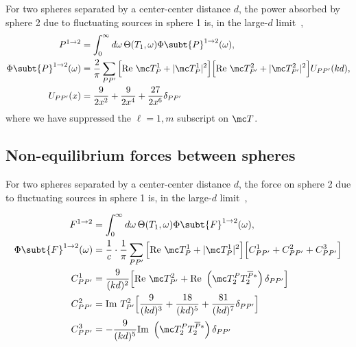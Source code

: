 \documentclass[letterpaper]{article}
\begin{document}
For two spheres separated by a center-center distance
$d$, the power absorbed by sphere 2 due to fluctuating
sources in sphere 1 is, in the large-$d$ limit~\cite{Kruger2012},
\begin{align*}
 P^{1\to 2} 
&= 
 \int_0^\infty d\omega \, \Theta(T_1,\omega) \Phi\subt{P}^{1\to 2}(\omega),
\\
 \Phi\subt{P}^{1\to 2}(\omega) 
&= 
 \frac{2}{\pi}\sum_{P P^\prime}
 \Big[ \text{Re }\mc T^1_{P} + |\mc T^1_{P}|^2\Big]
 \Big[ \text{Re }\mc T^2_{P^\prime} + |\mc T^2_{P^\prime}|^2\Big]
 U_{PP^\prime}(kd),
\\
 U_{PP^\prime}(x)
 &=\frac{9}{2x^2} + \frac{9}{2x^4} + \frac{27}{2x^6}\delta_{PP^\prime}
\end{align*}
where we have suppressed the $\ell=1, m$ subscript on
$\mc T$.

\subsection{Non-equilibrium forces between spheres}

For two spheres separated by a center-center distance
$d$, the force on sphere 2 due to fluctuating
sources in sphere 1 is, in the large-$d$ limit~\cite{Kruger2012},

\begin{align*}
 F^{1\to 2}
&=
 \int_0^\infty d\omega \, \Theta(T_1,\omega) \Phi\subt{F}^{1\to 2}(\omega),
\\
 \Phi\subt{F}^{1\to 2}(\omega)
&= \frac{1}{c}
   \cdot
   \frac{1}{\pi}\sum_{P P^\prime}
   \Big[ \text{Re }\mc T^1_P + |\mc T^1_P|^2\Big]
   \Big[ C^1_{PP^\prime} + C^2_{PP^\prime} + C^3_{PP^\prime} \Big]
\\
 C^1_{PP^\prime}
 &=\frac{9}{(kd)^2}
   \Big[ \text{Re }\mc T^2_{P^\prime} + 
         \text{Re }\left(\mc T_2^P T_2^{\overline{P}*}\right)\delta_{PP^\prime}
   \Big]
\\
 C^2_{PP^\prime}
 &=\text{Im }T^2_{P^\prime}
   \Big[ \frac{9}{(kd)^3} + \frac{18}{(kd)^5} + \frac{81}{(kd)^7}\delta_{PP^\prime}\Big]
\\
 C^3_{PP^\prime}
 &=-\frac{9}{(kd)^5}
    \text{Im }\left(\mc T_2^P T_2^{\overline{P}*}\right)\delta_{PP^\prime}
\end{align*}
\end{document}
